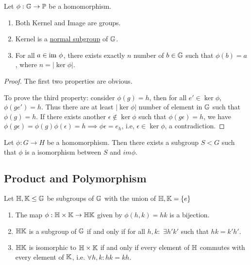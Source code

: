 \documentclass[../note.tex]{subfiles}
\begin{document}
\begin{theorem}
	Let $\phi: \mathbb{G} \rightarrow \mathbb{P}$ be a homomorphism.
	\begin{enumerate}
		\item Both Kernel and Image are groups.
		\item Kernel is a \hyperlink{def:normal_group}{normal subgroup} of $\mathbb{G}$.
		\item For all $a\in \text{im}{\ \phi}$, there exists exactly $n$ number of $b\in \mathbb{G}$ such that $\phi(b) = a$, where $n=|\ker{\phi}|$.
	\end{enumerate}
\end{theorem}

\begin{proof}
	The first two properties are obvious.

	To prove the third property: consider $\phi(g)=h$, then for all $e' \in \ker{\phi}$, $\phi( ge' )=h$. Thus there are at least $|\ker{\phi}|$ number of element in $\mathbb{G}$ such that $\phi(g)=h$. 
	If there exists another $\epsilon \notin \ker{\phi}$ such that $\phi(g \epsilon) = h$, we have $\phi(g \epsilon) = \phi(g)\phi(\epsilon) = h \implies \phi{\epsilon}=e_h$, i.e, $\epsilon \in \ker{\phi}$, a contradiction.
\end{proof}

\begin{hypothesis}
	Let $\phi: G \rightarrow H$ be a homomorphism. Then there exists a subgroup $S < G$ such that $\phi$ is a isomorphism between $S$ and $im \phi$.
\end{hypothesis}

\subsection{Product and Polymorphism}

\begin{theorem}
	Let $\mathbb{H}, \mathbb{K} \leq \mathbb{G}$ be subgroups of $\mathbb{G}$ with the union of $\mathbb{H}, \mathbb{K} = \{e\}$
	\begin{enumerate}
		\item The map $\phi: \mathbb{H}\times \mathbb{K} \rightarrow \mathbb{H}\mathbb{K}$ given by $\phi(h,k) = hk$ is a bijection.
		\item $\mathbb{H}\mathbb{K}$ is a subgroup of $\mathbb{G}$ if and only if for all $h, k: $ $\exists h' k'$ such that $hk = k'h'$.
		\item $\mathbb{H}\mathbb{K}$ is isomorphic to $\mathbb{H} \times \mathbb{K}$ if and only if every element of $\mathbb{H}$ commutes with every element of $\mathbb{K}$, i.e. $\forall h, k: hk=kh$.
	\end{enumerate}
\end{theorem}
\end{document}
